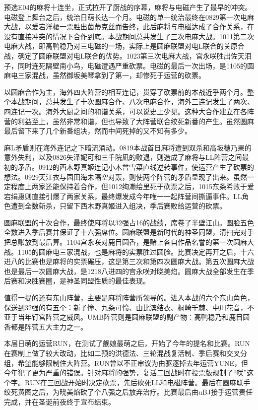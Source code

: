 预选E04的麻将十连坐，正式拉开了厨战的序幕，麻将与电磁产生了最早的冲突。电磁登上舞台之后，统治日萌长达一个月。电磁的单一统治最终在0829第一次电麻大战，以爱宕洋榎一票胜出茵蒂克丝而告终，此后麻将与电磁达成了合作关系，在没有直接冲突的情况下合作到底。本战期间总共发生了三次电麻大战。1011第二次电麻大战，即高鸭稳乃对三电磁的一场，实际上是圆麻联盟对电L联合的关原合战，确定了圆麻联盟对电L联合的优势。1023第三次电麻大战，宫永咲胜出佐天泪子，同时连死隔壁南小鸟，电磁遭遇严重砍票。电磁的最后一次出场，是1105的圆麻电三家混战，虽然御坂美琴拿到了第一，却惨死于运营的砍票。

以圆麻合作为主，海外四大阵营的相互连记，贯穿了砍票前的本战近乎两个月。整个本战期间，总共发生了十次圆麻合作、八次电麻合作，海外三连记发生了两次、四连记一次。海外大厨之间的和谐关系，可以说史上少见。这种大合作建立在各阵营的利益至上，虽然非常和谐，但也导致了大阵营联合绞死新番的产生。虽然圆麻最后留下来了几个新番组决，然而中间死掉的又不知有多少。

麻L矛盾则在海外连记之下暗流涌动。0819本战首日麻将遭到双杀和高坂穗乃果的意外失利，以及0826矢泽妮可和三千院凪的败退，则造成了麻将与LL阵营之间最初的矛盾。0912的西木野真姬连记小木曾雪菜直线逆转事件，使运营产生了砍票的想法。0929天江衣与园田海未隔空对轰，则使两个阵营的矛盾显现了出来。虽然一定程度上两家还能保持着合作，但1012绚濑绘里死于砍票之后，1015东条希败于爱宕绢惠则直接引爆了两家关系，最终爆发成今年唯一一起阵营间撕逼事件。LL角色遭到全数斩杀，只留下西木野真姬进入组决，季后赛败给运营的砍票。

圆麻联盟的十次合作，最终使麻将以32强占16的战绩，席卷了半壁江山。圆脸五色全数进入季后赛并保证了十六强席位。圆麻联盟是新时代的神圣同盟，清扫完对手把总账放到最后算。1104宫永咲对鹿目圆香，是赌上各自作品名誉的第一次圆麻大战。1105的圆麻电三家混战，也是麻将的实票胜过圆脸。比赛决定再开之后，十六进八的比赛也是麻将的实票碾压，这是第三次和第四次圆麻大战。第五次圆麻大战也是最后一次圆麻大战，是1218八进四的宫永咲对晓美焰。圆麻大战全部发生在季后赛和决胜赛圈，是神圣同盟性质的最佳表现。

值得一提的还有东山阵营，主要是麻将阵营所领导的。进入本战的六个东山角色，保送到32强的有五个：新子憧、九条可怜、由比滨结衣、桐崎千棘、中川花音，不亚于当年钉宫阵营之威风。UMB阵营则是圆麻联盟的副产物：高鸭稳乃和鹿目圆香都是阵营五大主力之一。

本届日萌的运营RUN，在测试了舰娘最萌之后，开始了今年的提名和比赛。RUN在赛制上做了较大改动，比如二预的洪德法、三轮混战复活制、季后赛和交叉分组，希望能够限制住大阵营。RUN曾以不正审议为由驱逐掉去年运营YUNE，但今年犯了更为严重的错误。针对麻将的强势，复活二回战时在投票版规制了“咲”这个字。RUN在三回战开始时决定砍票，先后砍死LL和电磁阵营。最后在圆麻联手绞死黄图之后，为晓美焰砍了个八强之后放弃治疗。比赛最后由uBJ接手运营责任完成，并在圣诞前夜终于宣布结束。

